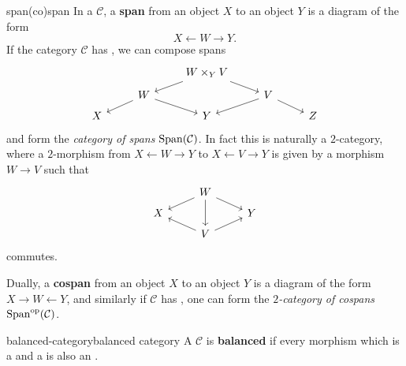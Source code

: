 \begin{topic}{span}{(co)span}
    In a  $\mathcal{C}$, a \textbf{span} from an object $X$ to an object $Y$ is a diagram of the form
    \[ X \longleftarrow W \longrightarrow Y . \]
    If the category $\mathcal{C}$ has , we can compose spans
    \[ \begin{tikzcd}[row sep=0.5em] && W \times_Y V \arrow{dl} \arrow{dr}  && \\ & W \arrow{dl} \arrow{dr} & & V \arrow{dl} \arrow{dr} & \\ X && Y && Z \end{tikzcd} \]
    and form the \textit{category of spans} $\textup{Span}(\mathcal{C})$. In fact this is naturally a $2$-category, where a $2$-morphism from $X \leftarrow W \rightarrow Y$ to $X \leftarrow V \rightarrow Y$ is given by a morphism $W \to V$ such that
    \[ \begin{tikzcd}[row sep=0.5em] & W \arrow{dd} \arrow{dl} \arrow{dr} & \\ X && Y \\ & V \arrow{ul} \arrow{ur} \end{tikzcd} \]
    commutes.
    
    Dually, a \textbf{cospan} from an object $X$ to an object $Y$ is a diagram of the form $X \rightarrow W \leftarrow Y$, and similarly if $\mathcal{C}$ has , one can form the \textit{$2$-category of cospans} $\textup{Span}^\textup{op}(\mathcal{C})$.
\end{topic}

\begin{topic}{balanced-category}{balanced category}
    A  $\mathcal{C}$ is \textbf{balanced} if every morphism which is a  and a  is also an .
\end{topic}

